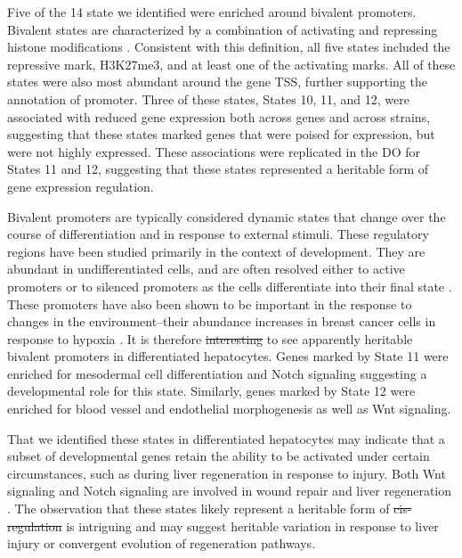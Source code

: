 \documentclass[
  11pt,
]{article}
\providecommand{\DIFaddtex}[1]{{\protect\color{blue}\uwave{#1}}} %
\providecommand{\DIFdeltex}[1]{{\protect\color{red}\sout{#1}}}                      %
\providecommand{\DIFaddbegin}{} %
\providecommand{\DIFaddend}{} %
\providecommand{\DIFdelbegin}{} %
\providecommand{\DIFdelend}{} %
\providecommand{\DIFadd}[1]{\texorpdfstring{\DIFaddtex{#1}}{#1}} %
\providecommand{\DIFdel}[1]{\texorpdfstring{\DIFdeltex{#1}}{}} %
\newcommand{\DIFscaledelfig}{0.5}
\newlength{\DIFdelgraphicswidth} %
\newlength{\DIFdelgraphicsheight} %
\newcommand{\DIFaddincludegraphics}[2][]{{\color{blue}\fbox{\DIFOincludegraphics[#1]{#2}}}} %
\newcommand{\DIFdelincludegraphics}[2][]{%
\sbox{\DIFdelgraphicsbox}{\DIFOincludegraphics[#1]{#2}}%
\settoboxwidth{\DIFdelgraphicswidth}{\DIFdelgraphicsbox} %
\settoboxtotalheight{\DIFdelgraphicsheight}{\DIFdelgraphicsbox} %
\scalebox{\DIFscaledelfig}{%
\parbox[b]{\DIFdelgraphicswidth}{\usebox{\DIFdelgraphicsbox}\\[-\baselineskip] \rule{\DIFdelgraphicswidth}{0em}}\llap{\resizebox{\DIFdelgraphicswidth}{\DIFdelgraphicsheight}{%
\setlength{\unitlength}{\DIFdelgraphicswidth}%
\begin{picture}(1,1)%
\thicklines\linethickness{2pt} %
{\color[rgb]{1,0,0}\put(0,0){\framebox(1,1){}}}%
{\color[rgb]{1,0,0}\put(0,0){\line( 1,1){1}}}%
{\color[rgb]{1,0,0}\put(0,1){\line(1,-1){1}}}%
\end{picture}%
}\hspace*{3pt}}} %
} %
\DeclareRobustCommand{\DIFaddbegin}{\DIFOaddbegin \let\includegraphics\DIFaddincludegraphics} %
\DeclareRobustCommand{\DIFaddend}{\DIFOaddend \let\includegraphics\DIFOincludegraphics} %
\DeclareRobustCommand{\DIFdelbegin}{\DIFOdelbegin \let\includegraphics\DIFdelincludegraphics} %
\DeclareRobustCommand{\DIFdelend}{\DIFOaddend \let\includegraphics\DIFOincludegraphics} %
\begin{document}
Five of the 14 state we identified were enriched around bivalent
promoters. Bivalent states are characterized by a combination of
activating and repressing histone modifications
\citep{pmid23788621, pmid22513113}. Consistent with this definition, all
five states included the repressive mark, H3K27me3, and at least one of
the activating marks. All of these states were also most abundant around
the gene TSS, further supporting the annotation of promoter. Three of
these states, States 10, 11, and 12, were associated with reduced gene
expression both across genes and across strains, suggesting that these
states marked genes that were poised for expression, but were not highly
expressed. These associations were replicated in the DO for States 11
and 12, suggesting that these states represented a heritable form of
gene expression regulation.

Bivalent promoters are typically considered dynamic states that change
over the course of differentiation and in response to external stimuli.
These regulatory regions have been studied primarily in the context of
development. They are abundant in undifferentiated cells, and are often
resolved either to active promoters or to silenced promoters as the
cells differentiate into their final state \citep{pmid23788621, 
pmid22513113}. These promoters have also been shown to be important in
the response to changes in the environment--their abundance increases in
breast cancer cells in response to hypoxia \citep{pmid27800026}. It is
therefore \DIFdelbegin \DIFdel{interesting }\DIFdelend \DIFaddbegin \DIFadd{notable }\DIFaddend to see apparently heritable bivalent promoters in
differentiated hepatocytes. Genes marked by State 11 were enriched for
mesodermal cell differentiation and Notch signaling suggesting a
developmental role for this state. Similarly, genes marked by State 12
were enriched for blood vessel and endothelial morphogenesis as well as
Wnt signaling.

That we identified these states in differentiated hepatocytes may
indicate that a subset of developmental genes retain the ability to be
activated under certain circumstances, such as during liver regeneration
in response to injury. Both Wnt signaling and Notch signaling are
involved in wound repair \citep{shi2015wnt, 
chigurupati2007involvement, whyte2012wnt} and liver regeneration
\citep{yue2018role, hu2021wnt, thompson2007wnt}. The observation that
these states likely represent a heritable form of
\DIFdelbegin \DIFdel{cis-regulation }\DIFdelend \DIFaddbegin \textit{\DIFadd{cis}}\DIFadd{-regulation }\DIFaddend is intriguing and may suggest heritable
variation in response to liver injury or convergent evolution of
regeneration pathways.
\end{document}
